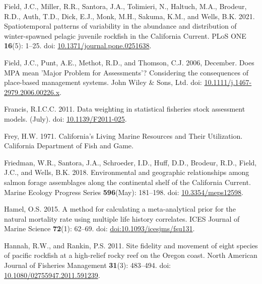 \documentclass[11pt,
  english,
]{article}
\newlength{\cslhangindent}
\newenvironment{CSLReferences}[2] %
 {%
  \setlength{\parindent}{0pt}
  \ifodd #1 \everypar{\setlength{\hangindent}{\cslhangindent}}\ignorespaces\fi
  \ifnum #2 > 0
  \setlength{\parskip}{#2\baselineskip}
  \fi
 }%
 {}
\begin{document}
\begin{CSLReferences}{1}{0}
\leavevmode{}%
Field, J.C., Miller, R.R., Santora, J.A., Tolimieri, N., Haltuch, M.A., Brodeur, R.D., Auth, T.D., Dick, E.J., Monk, M.H., Sakuma, K.M., and Wells, B.K. 2021. {Spatiotemporal patterns of variability in the abundance and distribution of winter-spawned pelagic juvenile rockfish in the California Current}. PLoS ONE \textbf{16}(5): 1--25. doi: \href{https://doi.org/10.1371/journal.pone.0251638}{10.1371/journal.pone.0251638}.

\leavevmode{}%
Field, J.C., Punt, A.E., Methot, R.D., and Thomson, C.J. 2006, December. {Does MPA mean 'Major Problem for Assessments'? Considering the consequences of place-based management systems}. John Wiley \& Sons, Ltd. doi: \href{https://doi.org/10.1111/j.1467-2979.2006.00226.x}{10.1111/j.1467-2979.2006.00226.x}.

\leavevmode{}%
Francis, R.I.C.C. 2011. {Data weighting in statistical fisheries stock assessment models}. (July). doi: \href{https://doi.org/10.1139/F2011-025}{10.1139/F2011-025}.

\leavevmode{}%
Frey, H.W. 1971. {California's Living Marine Resources and Their Utilization. California Department of Fish and Game}.

\leavevmode{}%
Friedman, W.R., Santora, J.A., Schroeder, I.D., Huff, D.D., Brodeur, R.D., Field, J.C., and Wells, B.K. 2018. {Environmental and geographic relationships among salmon forage assemblages along the continental shelf of the California Current}. Marine Ecology Progress Series \textbf{596}(May): 181--198. doi: \href{https://doi.org/10.3354/meps12598}{10.3354/meps12598}.

\leavevmode{}%
Hamel, O.S. 2015. {A method for calculating a meta-analytical prior for the natural mortality rate using multiple life history correlates}. ICES Journal of Marine Science \textbf{72}(1): 62--69. doi: \href{https://doi.org/doi:10.1093/icesjms/fsu131}{doi:10.1093/icesjms/fsu131}.

\leavevmode{}%
Hannah, R.W., and Rankin, P.S. 2011. {Site fidelity and movement of eight species of pacific rockfish at a high-relief rocky reef on the Oregon coast}. North American Journal of Fisheries Management \textbf{31}(3): 483--494. doi: \href{https://doi.org/10.1080/02755947.2011.591239}{10.1080/02755947.2011.591239}.


\end{CSLReferences}
\end{document}
